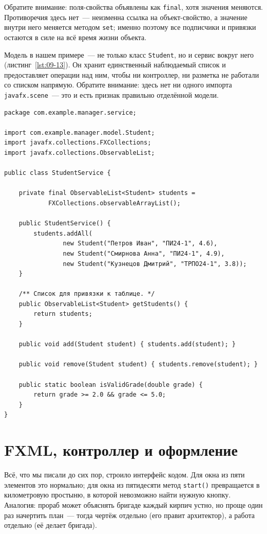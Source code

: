 Обратите внимание: поля-свойства объявлены как \texttt{final}, хотя значения
меняются. Противоречия здесь нет~--- неизменна ссылка на объект-свойство, а
значение внутри него меняется методом \texttt{set}; именно поэтому все
подписчики и привязки остаются в силе на всё время жизни объекта.

Модель в нашем примере~--- не только класс \texttt{Student}, но и сервис вокруг
него (листинг~\ref{lst:09-13}). Он хранит единственный наблюдаемый список и
предоставляет операции над ним, чтобы ни контроллер, ни разметка не работали со
списком напрямую. Обратите внимание: здесь нет ни одного импорта
\texttt{javafx.scene}~--- это и есть признак правильно отделённой модели.

\begin{listing}[H]
\begin{verbatim}
package com.example.manager.service;

import com.example.manager.model.Student;
import javafx.collections.FXCollections;
import javafx.collections.ObservableList;

public class StudentService {

    private final ObservableList<Student> students =
            FXCollections.observableArrayList();

    public StudentService() {
        students.addAll(
                new Student("Петров Иван", "ПИ24-1", 4.6),
                new Student("Смирнова Анна", "ПИ24-1", 4.9),
                new Student("Кузнецов Дмитрий", "ТРПО24-1", 3.8));
    }

    /** Список для привязки к таблице. */
    public ObservableList<Student> getStudents() {
        return students;
    }

    public void add(Student student) { students.add(student); }

    public void remove(Student student) { students.remove(student); }

    public static boolean isValidGrade(double grade) {
        return grade >= 2.0 && grade <= 5.0;
    }
}
\end{verbatim}
\caption{Модель: класс StudentService}
\label{lst:09-13}
\end{listing}

\section{FXML, контроллер и оформление}

Всё, что мы писали до сих пор, строило интерфейс кодом. Для окна из пяти
элементов это нормально; для окна из пятидесяти метод \texttt{start()}
превращается в километровую простыню, в которой невозможно найти нужную кнопку.
Аналогия: прораб может объяснять бригаде каждый кирпич устно, но проще один раз
начертить план~--- тогда чертёж отдельно (его правит архитектор), а работа
отдельно (её делает бригада).

